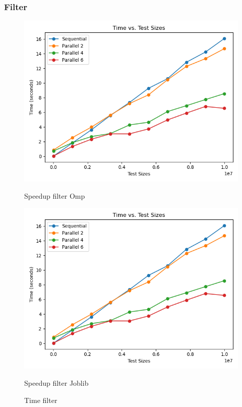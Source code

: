 \documentclass[11pt]{article}
\begin{document}
    \subsubsection{Filter}\label{subsubsec:filter}
    \begin{figure}[H]
        \centering
        \includegraphics[width=\linewidth]{plot_filter_time}
            \caption{Speedup filter Omp}\label{fig:filter_time_omp}
        \endminipage\hfill
        \includegraphics[width=\linewidth]{plot_filter_time}
            \caption{Speedup filter Joblib}\label{fig:filter_time_joblib}
        \endminipage\hfill
        \caption{Time filter}
    \end{figure}
\end{document}
